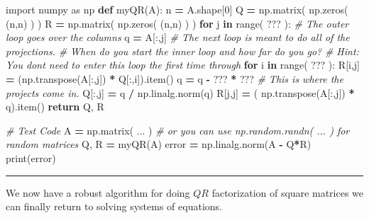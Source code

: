 \documentclass[
]{book}
\newenvironment{Shaded}{\begin{snugshade}}{\end{snugshade}}
\newcommand{\BuiltInTok}[1]{#1}
\newcommand{\CommentTok}[1]{\textcolor[rgb]{0.56,0.35,0.01}{\textit{#1}}}
\newcommand{\ControlFlowTok}[1]{\textcolor[rgb]{0.13,0.29,0.53}{\textbf{#1}}}
\newcommand{\DecValTok}[1]{\textcolor[rgb]{0.00,0.00,0.81}{#1}}
\newcommand{\ImportTok}[1]{#1}
\newcommand{\KeywordTok}[1]{\textcolor[rgb]{0.13,0.29,0.53}{\textbf{#1}}}
\newcommand{\NormalTok}[1]{#1}
\newcommand{\OperatorTok}[1]{\textcolor[rgb]{0.81,0.36,0.00}{\textbf{#1}}}
\theoremstyle{definition}
\theoremstyle{definition}
\theoremstyle{definition}
\theoremstyle{remark}
\begin{document}
\begin{Shaded}
\begin{Highlighting}[]
\ImportTok{import}\NormalTok{ numpy }\ImportTok{as}\NormalTok{ np}
\KeywordTok{def}\NormalTok{ myQR(A):}
\NormalTok{    n }\OperatorTok{=}\NormalTok{ A.shape[}\DecValTok{0}\NormalTok{]}
\NormalTok{    Q }\OperatorTok{=}\NormalTok{ np.matrix( np.zeros( (n,n) ) )}
\NormalTok{    R }\OperatorTok{=}\NormalTok{ np.matrix( np.zeros( (n,n) ) )}
    \ControlFlowTok{for}\NormalTok{ j }\KeywordTok{in} \BuiltInTok{range}\NormalTok{( ??? ): }\CommentTok{\# The outer loop goes over the columns}
\NormalTok{        q }\OperatorTok{=}\NormalTok{ A[:,j]}
        \CommentTok{\# The next loop is meant to do all of the projections.}
        \CommentTok{\# When do you start the inner loop and how far do you go?}
        \CommentTok{\# Hint: You don\textquotesingle{}t need to enter this loop the first time through}
        \ControlFlowTok{for}\NormalTok{ i }\KeywordTok{in} \BuiltInTok{range}\NormalTok{( ??? ): }
\NormalTok{            R[i,j] }\OperatorTok{=}\NormalTok{ (np.transpose(A[:,j]) }\OperatorTok{*}\NormalTok{ Q[:,i]).item()}
\NormalTok{            q }\OperatorTok{=}\NormalTok{ q }\OperatorTok{{-}}\NormalTok{  ??? }\OperatorTok{*}\NormalTok{ ??? }\CommentTok{\# This is where the projects come in.}
\NormalTok{        Q[:,j] }\OperatorTok{=}\NormalTok{ q }\OperatorTok{/}\NormalTok{ np.linalg.norm(q)}
\NormalTok{        R[j,j] }\OperatorTok{=}\NormalTok{ ( np.transpose(A[:,j]) }\OperatorTok{*}\NormalTok{ q).item()}
    \ControlFlowTok{return}\NormalTok{ Q, R}
\end{Highlighting}
\end{Shaded}

\begin{Shaded}
\begin{Highlighting}[]
\CommentTok{\# Test Code}
\NormalTok{A }\OperatorTok{=}\NormalTok{ np.matrix( ... ) }\CommentTok{\# or you can use np.random.randn( ... ) for random matrices}
\NormalTok{Q, R }\OperatorTok{=}\NormalTok{ myQR(A)}
\NormalTok{error }\OperatorTok{=}\NormalTok{ np.linalg.norm(A }\OperatorTok{{-}}\NormalTok{ Q}\OperatorTok{*}\NormalTok{R)}
\BuiltInTok{print}\NormalTok{(error)}
\end{Highlighting}
\end{Shaded}

\begin{center}\rule{0.5\linewidth}{0.5pt}\end{center}

We now have a robust algorithm for doing \(QR\) factorization of square matrices we can finally return to solving systems of equations.
\end{document}
